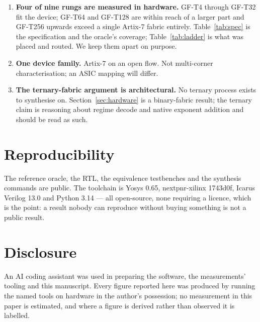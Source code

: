 \documentclass[11pt]{article}
\theoremstyle{definition}
\begin{document}
\begin{enumerate}[leftmargin=*]
\item \textbf{Four of nine rungs are measured in hardware.} GF-T4 through GF-T32 fit the
device; GF-T64 and GF-T128 are within reach of a larger part and GF-T256 upwards
exceed a single Artix-7 fabric entirely. Table~\ref{tab:spec} is the
specification and the oracle's coverage; Table~\ref{tab:ladder} is what was
placed and routed. We keep them apart on purpose.

\item \textbf{One device family.} Artix-7 on an open flow. Not multi-corner
characterisation; an ASIC mapping will differ.

\item \textbf{The ternary-fabric argument is architectural.} No ternary process
exists to synthesise on. Section~\ref{sec:hardware} is a binary-fabric result;
the ternary claim is reasoning about regime decode and native exponent addition
and should be read as such.
\end{enumerate}

\section*{Reproducibility}

The reference oracle, the RTL, the equivalence testbenches and the synthesis
commands are public. The toolchain is Yosys 0.65, nextpnr-xilinx 1743d0f,
Icarus Verilog 13.0 and Python 3.14 --- all open-source, none requiring a
licence, which is the point: a result nobody can reproduce without buying
something is not a public result.

\section*{Disclosure}

An AI coding assistant was used in preparing the software, the measurements'
tooling and this manuscript. Every figure reported here was produced by running
the named tools on hardware in the author's possession; no measurement in this
paper is estimated, and where a figure is derived rather than observed it is
labelled.
\end{document}
